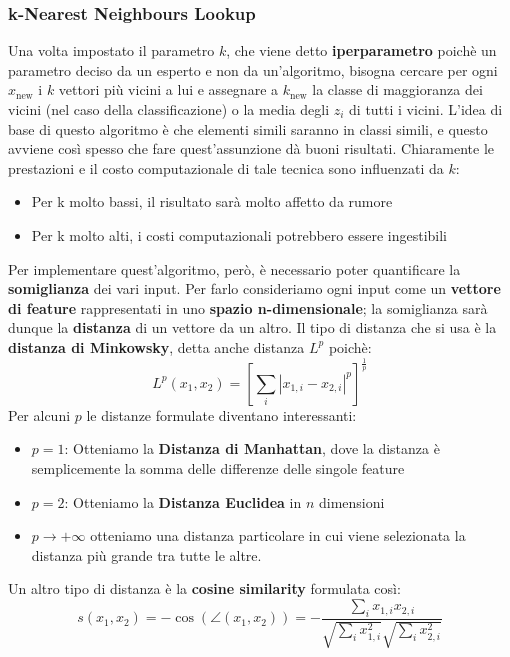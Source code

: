 \subsubsection{k-Nearest Neighbours Lookup}
Una volta impostato il parametro $k$, che viene detto \textbf{iperparametro} poichè un parametro deciso 
da un esperto e non da un'algoritmo, bisogna cercare per ogni $x_\text{new}$ i $k$ vettori più vicini a lui
e assegnare a $k_\text{new}$ la classe di maggioranza dei vicini (nel caso della classificazione) o la
media degli $z_i$ di tutti i vicini. L'idea di base di questo algoritmo è che elementi simili saranno in 
classi simili, e questo avviene così spesso che fare quest'assunzione dà buoni risultati.
Chiaramente le prestazioni e il costo computazionale di tale tecnica sono influenzati da $k$:
\begin{itemize}
    \item Per k molto bassi, il risultato sarà molto affetto da rumore 
    \item Per k molto alti, i costi computazionali potrebbero essere ingestibili
\end{itemize}
Per implementare quest'algoritmo, però, è necessario poter quantificare la \textbf{somiglianza} dei vari
input. Per farlo consideriamo ogni input come un \textbf{vettore di feature} rappresentati in uno 
\textbf{spazio n-dimensionale}; la somiglianza sarà dunque la \textbf{distanza} di un vettore da un altro.
Il tipo di distanza che si usa è la \textbf{distanza di Minkowsky}, detta anche distanza $L^p$ poichè:
\begin{equation}
    L^p(x_1,x_2) = \left[\sum_{i} |x_{1,i} - x_{2,i}|^p\right]^\frac{1}{p}
\end{equation}
Per alcuni $p$ le distanze formulate diventano interessanti:
\begin{itemize}
    \item $p = 1$: Otteniamo la \textbf{Distanza di Manhattan}, dove la distanza è semplicemente la somma delle differenze delle singole feature
    \item $p = 2$: Otteniamo la \textbf{Distanza Euclidea} in $n$ dimensioni
    \item $p \to +\infty$ otteniamo una distanza particolare in cui viene selezionata la distanza più grande tra tutte le altre.
\end{itemize}
Un altro tipo di distanza è la \textbf{cosine similarity} formulata così:
\begin{equation}
    s(x_1,x_2) = -\cos(\angle(x_1,x_2)) = -\frac{\sum_{i} x_{1,i}x_{2,i}}{\sqrt{\sum_{i} x_{1,i}^2}\sqrt{\sum_{i} x_{2,i}^2}}
\end{equation}

